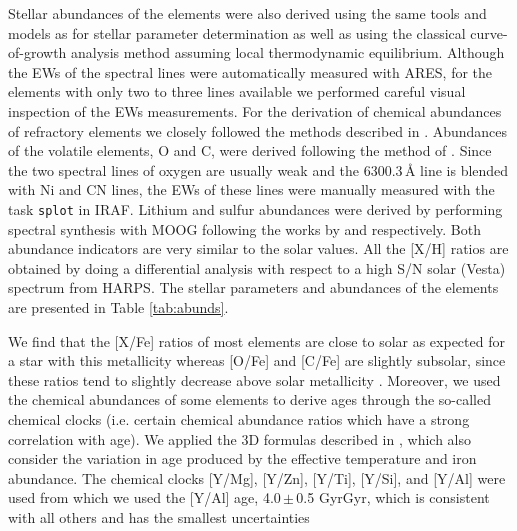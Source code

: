 \documentclass[fleqn,usenatbib]{mnras}
\newcommand{\Tstarage}{4.0\,$\pm$\,0.5 Gyr}
\begin{document}
Stellar abundances of the elements were also derived using the same tools and models as for stellar parameter determination as well as using the classical curve-of-growth analysis method assuming local thermodynamic equilibrium. Although the EWs of the spectral lines were automatically measured with ARES, for the elements with only two to three lines available we performed careful visual inspection of the EWs measurements. For the derivation of chemical abundances of refractory elements we closely followed the methods described in \citep[e.g.][]{Adibekyan-12, Adibekyan-15, Delgado-14, Delgado-17}. Abundances of the volatile elements, O and C, were derived following the method of \cite{Delgado-10, 2015A&A...576A..89B}. Since the two spectral lines of oxygen are usually weak and the 6300.3\,\AA{} line is blended with Ni and CN lines, the EWs of these lines were manually measured with the task \texttt{splot} in IRAF. Lithium and sulfur abundances were derived by performing spectral synthesis with MOOG following the works by \citet{Delgado-14} and \citet{Costa_Silva2020} respectively. Both abundance indicators are very similar to the solar values.
All the [X/H] ratios are obtained by doing a differential analysis with respect to a high S/N solar (Vesta) spectrum from HARPS. The stellar parameters and abundances of the elements are presented in Table \ref{tab:abunds}. 

We find that the [X/Fe] ratios of most elements are close to solar as expected for a star with this metallicity whereas [O/Fe] and [C/Fe] are slightly subsolar, since these ratios tend to slightly decrease above solar metallicity \cite[e.g.][]{Bertrandelis-15,Franchini2020}. Moreover, we used the chemical abundances of some elements to derive ages through the so-called chemical clocks (i.e. certain chemical abundance ratios which have a strong correlation with age). We applied the 3D formulas described in \citet{Delgado-19}, which also consider the variation in age produced by the effective temperature and iron abundance. The chemical clocks [Y/Mg], [Y/Zn], [Y/Ti], [Y/Si], and [Y/Al] were used from which we used the [Y/Al] age, \Tstarage{}Gyr, which is consistent with all others and has the smallest uncertainties
\end{document}
